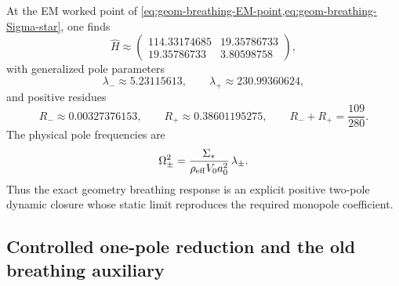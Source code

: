 \documentclass[11pt]{article}
\begin{document}
At the EM worked point of
\cref{eq:geom-breathing-EM-point,eq:geom-breathing-Sigma-star}, one finds
\begin{equation}
\widehat H\approx
\begin{pmatrix}
114.33174685 & 19.35786733\\[3pt]
19.35786733 & 3.80598758
\end{pmatrix},
\label{eq:geom-breathing-Hhat-EM}
\end{equation}
with generalized pole parameters
\begin{equation}
\lambda_-\approx 5.23115613,
\qquad
\lambda_+\approx 230.99360624,
\label{eq:geom-breathing-lambdas-affine}
\end{equation}
and positive residues
\begin{equation}
R_-\approx 0.00327376153,
\qquad
R_+\approx 0.38601195275,
\qquad
R_-+R_+=\frac{109}{280}.
\label{eq:geom-breathing-residues-affine}
\end{equation}
The physical pole frequencies are
\begin{equation}
\Omega_\pm^2
=
\frac{\Sigma_*}{\rho_{\rm eff}V_0a_0^2}\,\lambda_\pm.
\label{eq:geom-breathing-physical-poles-affine}
\end{equation}
Thus the exact geometry breathing response is an explicit positive two-pole dynamic
closure whose static limit reproduces the required monopole coefficient.

\subsection{Controlled one-pole reduction and the old breathing auxiliary}
\label{app:geom-breathing-pade}
\end{document}
